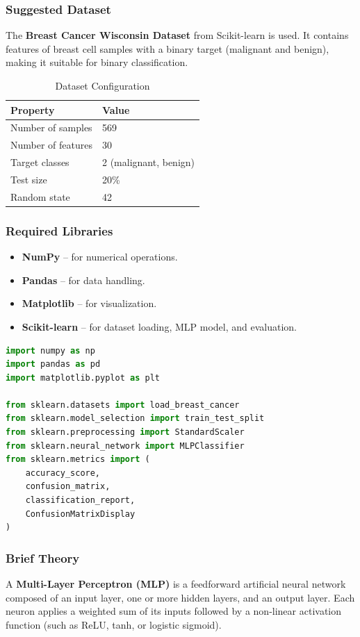 \documentclass[a4paper,11pt]{article}
\begin{document}
\begin{itemize}
\subsubsection{Suggested Dataset}
The \textbf{Breast Cancer Wisconsin Dataset} from Scikit-learn is used. It contains features of breast cell samples with a binary target (malignant and benign), making it suitable for binary classification.

\begin{table}[H]
\centering
\caption{Dataset Configuration}
\begin{tabular}{ll}
\toprule
\textbf{Property} & \textbf{Value} \\
\midrule
Number of samples  & 569 \\
Number of features & 30 \\
Target classes     & 2 (malignant, benign) \\
Test size          & 20\% \\
Random state       & 42 \\
\bottomrule
\end{tabular}
\end{table}

\subsubsection{Required Libraries}
\begin{itemize}
    \item \textbf{NumPy} -- for numerical operations.
    \item \textbf{Pandas} -- for data handling.
    \item \textbf{Matplotlib} -- for visualization.
    \item \textbf{Scikit-learn} -- for dataset loading, MLP model, and evaluation.
\end{itemize}

\begin{lstlisting}[language=Python, caption={Required Imports}]
import numpy as np
import pandas as pd
import matplotlib.pyplot as plt

from sklearn.datasets import load_breast_cancer
from sklearn.model_selection import train_test_split
from sklearn.preprocessing import StandardScaler
from sklearn.neural_network import MLPClassifier
from sklearn.metrics import (
    accuracy_score,
    confusion_matrix,
    classification_report,
    ConfusionMatrixDisplay
)
\end{lstlisting}

\subsubsection{Brief Theory}
A \textbf{Multi-Layer Perceptron (MLP)} is a feedforward artificial neural network composed of an input layer, one or more hidden layers, and an output layer. Each neuron applies a weighted sum of its inputs followed by a non-linear activation function (such as ReLU, tanh, or logistic sigmoid).


\end{itemize}
\end{document}
